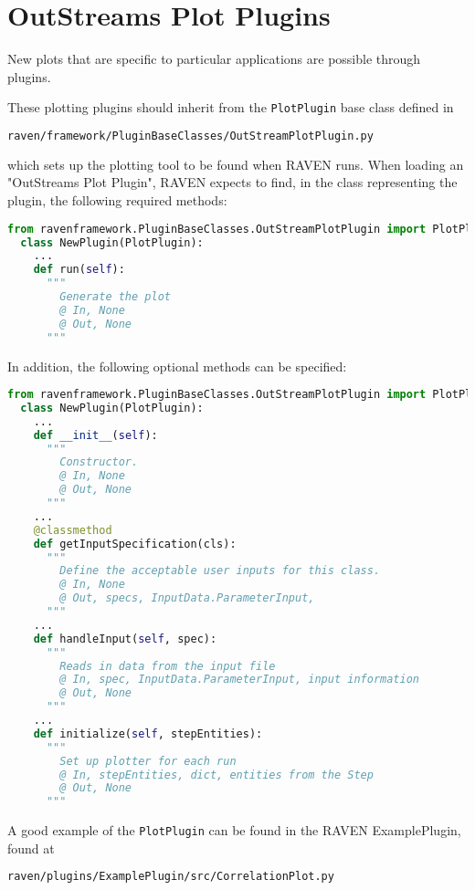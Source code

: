 \section{OutStreams Plot Plugins}
\label{sec:outstreams_plot}
New plots that are specific to particular applications are possible through 
 plugins.

These plotting plugins should inherit from the \texttt{PlotPlugin} base class defined in
\begin{lstlisting}[language=bash]
  raven/framework/PluginBaseClasses/OutStreamPlotPlugin.py
\end{lstlisting}
which sets up the plotting tool to be found when RAVEN runs.
When loading an "OutStreams Plot Plugin", RAVEN expects to find, in the class
representing the plugin, the following required methods:
\begin{lstlisting}[language=python, basicstyle=\scriptsize\ttfamily, breaklines=True, columns=fullflexible]
  from ravenframework.PluginBaseClasses.OutStreamPlotPlugin import PlotPlugin
  class NewPlugin(PlotPlugin):
    ...
    def run(self):
      """
        Generate the plot
        @ In, None
        @ Out, None
      """
\end{lstlisting}
In addition, the following optional methods can be specified:
\begin{lstlisting}[language=python, basicstyle=\scriptsize\ttfamily, breaklines=True, columns=fullflexible]
  from ravenframework.PluginBaseClasses.OutStreamPlotPlugin import PlotPlugin
  class NewPlugin(PlotPlugin):
    ...
    def __init__(self):
      """
        Constructor.
        @ In, None
        @ Out, None
      """
    ...
    @classmethod
    def getInputSpecification(cls):
      """
        Define the acceptable user inputs for this class.
        @ In, None
        @ Out, specs, InputData.ParameterInput,
      """
    ...
    def handleInput(self, spec):
      """
        Reads in data from the input file
        @ In, spec, InputData.ParameterInput, input information
        @ Out, None
      """
    ...
    def initialize(self, stepEntities):
      """
        Set up plotter for each run
        @ In, stepEntities, dict, entities from the Step
        @ Out, None
      """
\end{lstlisting}

A good example of the \texttt{PlotPlugin} can be found in the RAVEN ExamplePlugin, found at
\begin{lstlisting}[language=bash]
  raven/plugins/ExamplePlugin/src/CorrelationPlot.py
\end{lstlisting}

